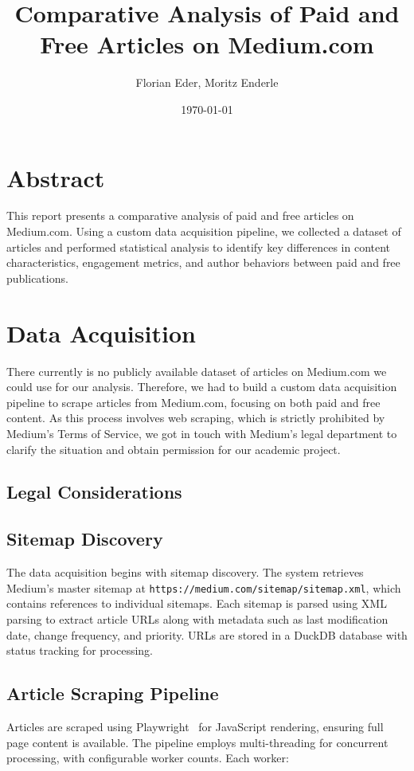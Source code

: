 \documentclass[11pt,a4paper]{article}
\title{\Huge\bfseries Comparative Analysis of Paid and Free Articles on Medium.com}
\author{Florian Eder, Moritz Enderle}
\date{\today}
\newcommand{\code}[1]{\texttt{#1}}
\begin{document}
\maketitle
\thispagestyle{empty}

\newpage
\tableofcontents
\newpage

\section*{Abstract}
This report presents a comparative analysis of paid and free articles on Medium.com. Using a custom data acquisition pipeline, we collected a dataset of articles and performed statistical analysis to identify key differences in content characteristics, engagement metrics, and author behaviors between paid and free publications.

\section{Data Acquisition}

There currently is no publicly available dataset of articles on Medium.com we could use for our analysis. 
Therefore, we had to build a custom data acquisition pipeline to scrape articles from Medium.com, focusing on both paid and free content. 
As this process involves web scraping, which is strictly prohibited by Medium's Terms of Service, we got in touch with Medium's legal department to clarify the situation and obtain permission for our academic project.

\subsection{Legal Considerations}

\subsection{Sitemap Discovery}
The data acquisition begins with sitemap discovery. The system retrieves Medium's master sitemap at \code{https://medium.com/sitemap/sitemap.xml}, which contains references to individual sitemaps. Each sitemap is parsed using XML parsing to extract article URLs along with metadata such as last modification date, change frequency, and priority. URLs are stored in a DuckDB database with status tracking for processing.

\subsection{Article Scraping Pipeline}
Articles are scraped using Playwright~\cite{playwright} for JavaScript rendering, ensuring full page content is available. The pipeline employs multi-threading for concurrent processing, with configurable worker counts. Each worker:
\end{document}
